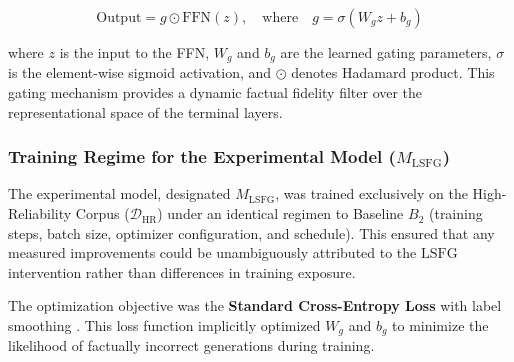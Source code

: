 \[
\text{Output} = g \odot \text{FFN}(z), \quad \text{where} \quad g = \sigma(W_g z + b_g)
\]

\noindent
where $z$ is the input to the FFN, $W_g$ and $b_g$ are the learned gating parameters, $\sigma$ is the element-wise sigmoid activation, and $\odot$ denotes Hadamard product. This gating mechanism provides a dynamic factual fidelity filter over the representational space of the terminal layers.

\subsubsection{Training Regime for the Experimental Model ($M_{\text{LSFG}}$)}
\label{sec:experimental_training}
The experimental model, designated $M_{\text{LSFG}}$, was trained exclusively on the High-Reliability Corpus ($\mathcal{D}_{\text{HR}}$) under an identical regimen to Baseline $B_2$ (training steps, batch size, optimizer configuration, and schedule). This ensured that any measured improvements could be unambiguously attributed to the $\text{LSFG}$ intervention rather than differences in training exposure.

The optimization objective was the \textbf{Standard Cross-Entropy Loss} with label smoothing \cite{vaswani2017attention}. This loss function implicitly optimized $W_g$ and $b_g$ to minimize the likelihood of factually incorrect generations during training.
